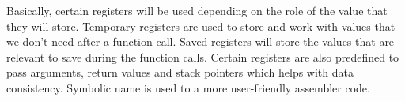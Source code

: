 Basically, certain registers will be used depending on the role of the value that they will store. Temporary registers are used to store and work with values that we don't need after a function call. Saved registers will store the values that are relevant to save during the function calls.  Certain registers are also predefined to pass arguments, return values and stack pointers which helps with data consistency. Symbolic name is used to a more user-friendly assembler code. 



